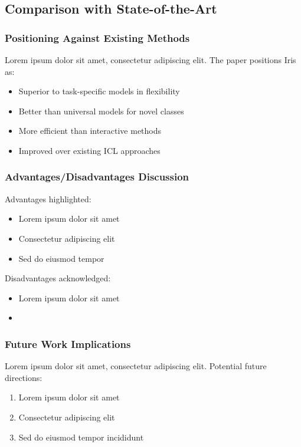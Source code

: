 \subsection{Comparison with State-of-the-Art}
\subsubsection{Positioning Against Existing Methods}
Lorem ipsum dolor sit amet, consectetur adipiscing elit. The paper positions Iris as:
\begin{itemize}
    \item Superior to task-specific models in flexibility
    \item Better than universal models for novel classes
    \item More efficient than interactive methods
    \item Improved over existing ICL approaches
\end{itemize}

\subsubsection{Advantages/Disadvantages Discussion}

Advantages highlighted:
\begin{itemize}
    \item Lorem ipsum dolor sit amet
    \item Consectetur adipiscing elit
    \item Sed do eiusmod tempor
\end{itemize}

Disadvantages acknowledged:
\begin{itemize}
    \item Lorem ipsum dolor sit amet
    \item {}
\end{itemize}

\subsubsection{Future Work Implications}
Lorem ipsum dolor sit amet, consectetur adipiscing elit. Potential future directions:
\begin{enumerate}
    \item Lorem ipsum dolor sit amet
    \item Consectetur adipiscing elit
    \item Sed do eiusmod tempor incididunt
\end{enumerate}

